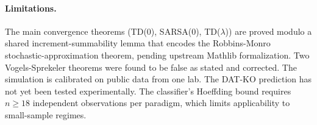 \paragraph{Limitations.}
The main convergence theorems (TD(0), SARSA(0), TD($\lambda$))
are proved modulo a shared increment-summability lemma that
encodes the Robbins-Monro stochastic-approximation theorem,
pending upstream Mathlib formalization. Two Vogels-Sprekeler
theorems were found to be false as stated and corrected.
The simulation is calibrated on public data from one lab.
The DAT-KO prediction has not yet been tested experimentally.
The classifier's Hoeffding bound requires $n \ge 18$ independent
observations per paradigm, which limits applicability to
small-sample regimes.
